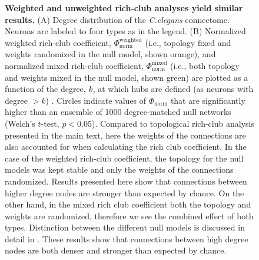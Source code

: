 \begin{figure}[h!]
 \caption{{\bf Weighted and unweighted rich-club analyses yield similar results.}
   (A) Degree distribution of the \emph{C.elegans} connectome.
    Neurons are labeled to four types as in the legend.
    (B)
    Normalized weighted rich-club coefficient, $\Phi_\mathrm{norm}^\mathrm{weighted}$ (i.e., topology fixed and weights randomized in the null model, shown orange), and
    normalized mixed rich-club coefficient, $\Phi_\mathrm{norm}^\mathrm{mixed}$ (i.e., both topology and weights mixed in the null model, shown green) are plotted as a function of the degree, $k$, at which hubs are defined (as neurons with degree $>k$) \citep{Alstott2014}.
    Circles indicate values of $\Phi_\mathrm{norm}$ that are significantly higher than an ensemble of 1000 degree-matched null networks (Welch's $t$-test, $p < 0.05$).
    Compared to topological rich-club analysis presented in the main text, here the weights of the connections are also accounted for when calculating the rich club coefficient.
    In the case of the weighted rich-club coefficient, the topology for the null models was kept stable and only the weights of the connections randomized. Results presented here show that connections between higher degree nodes are stronger than expected by chance.
    On the other hand, in the mixed rich club coefficient both the topology and weights are randomized, therefore we see the combined effect of both types.
    Distinction between the different null models is discussed in detail in \citep{Alstott2014}.
    These results show that connections between high degree nodes are both denser and stronger than expected by chance.}
\label{fig:Ch2S5_Fig}
\end{figure}


